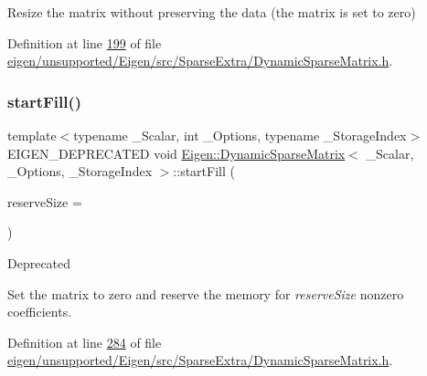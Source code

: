 Resize the matrix without preserving the data (the matrix is set to zero) 

Definition at line \hyperlink{eigen_2unsupported_2_eigen_2src_2_sparse_extra_2_dynamic_sparse_matrix_8h_source_l00199}{199} of file \hyperlink{eigen_2unsupported_2_eigen_2src_2_sparse_extra_2_dynamic_sparse_matrix_8h_source}{eigen/unsupported/\+Eigen/src/\+Sparse\+Extra/\+Dynamic\+Sparse\+Matrix.\+h}.

\mbox{\label{class_eigen_1_1_dynamic_sparse_matrix_abade0bf46139d8577aa24ead30c76771}} 
\subsubsection{\texorpdfstring{start\+Fill()}{startFill()}\hspace{0.1cm}{\footnotesize\ttfamily [1/2]}}
{\footnotesize\ttfamily template$<$typename \+\_\+\+Scalar, int \+\_\+\+Options, typename \+\_\+\+Storage\+Index$>$ \\
E\+I\+G\+E\+N\+\_\+\+D\+E\+P\+R\+E\+C\+A\+T\+ED void \hyperlink{class_eigen_1_1_dynamic_sparse_matrix}{Eigen\+::\+Dynamic\+Sparse\+Matrix}$<$ \+\_\+\+Scalar, \+\_\+\+Options, \+\_\+\+Storage\+Index $>$\+::start\+Fill (\begin{DoxyParamCaption}\item[{\hyperlink{group___core___module_a554f30542cc2316add4b1ea0a492ff02}{Index}}]{reserve\+Size = {} }\end{DoxyParamCaption})\hspace{0.3cm}{\ttfamily [inline]}}

\begin{DoxyRefDesc}{Deprecated}
\item[\hyperlink{deprecated__deprecated000041}{Deprecated}]Set the matrix to zero and reserve the memory for {\itshape reserve\+Size} nonzero coefficients. \end{DoxyRefDesc}


Definition at line \hyperlink{eigen_2unsupported_2_eigen_2src_2_sparse_extra_2_dynamic_sparse_matrix_8h_source_l00284}{284} of file \hyperlink{eigen_2unsupported_2_eigen_2src_2_sparse_extra_2_dynamic_sparse_matrix_8h_source}{eigen/unsupported/\+Eigen/src/\+Sparse\+Extra/\+Dynamic\+Sparse\+Matrix.\+h}.

